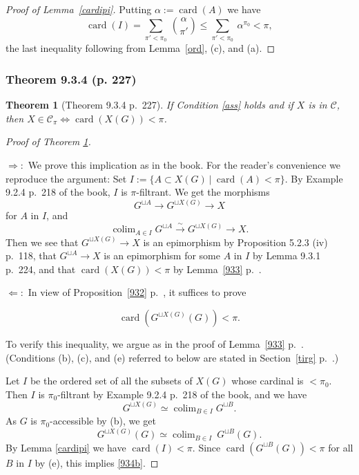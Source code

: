 \documentclass[12pt]{article}%
\newtheorem{thm}{Theorem}%
\theoremstyle{remark}
\theoremstyle{definition}
\newcommand{\nn}{\noindent}
\newcommand{\C}{\mathcal C}
\newcommand{\si}{\Leftarrow}
\newcommand{\ssi}{\Leftrightarrow}%
\newcommand{\then}{\Rightarrow}
\newcommand{\xr}{\xrightarrow}
\DeclareMathOperator*{\colim}{colim}
\DeclareMathOperator{\card}{card}%
\begin{document}
\begin{proof}[Proof of Lemma~\ref{cardipi}] 
Putting $\alpha:=\card(A)$ we have
$$
\card(I)=\sum_{\pi'<\pi_0}\ \binom{\alpha}{\pi'}\le\sum_{\pi'<\pi_0}\ \alpha^{\pi_0}<\pi,
$$ 
the last inequality following from Lemma~\ref{ord}, (c), and (a). 
\end{proof}

\subsubsection{Theorem 9.3.4 (p. 227)}

\begin{thm}[Theorem 9.3.4 p.~227]\label{934}
If Condition \ref{ass} holds and if $X$ is in $\C$, then $X\in\C_\pi\ssi\card(X(G))<\pi$.
\end{thm}

\begin{proof}[Proof of Theorem \ref{934}]${}$

\nn$\then:$ We prove this implication as in the book. For the reader's convenience we reproduce the argument: Set $I:=\{A\subset X(G)\ |\ \card(A)<\pi\}$. By Example 9.2.4 p.~218 of the book, $I$ is $\pi$-filtrant. We get the morphisms 
$$
G^{\sqcup A}\to G^{\sqcup X(G)}\to X
$$ 
for $A$ in $I$, and 
$$
\colim_{A\in I}G^{\sqcup A}\xr\sim G^{\sqcup X(G)}\to X.
$$ 
Then we see that $G^{\sqcup X(G)}\to X$ is an epimorphism by Proposition 5.2.3 (iv) p.~118, that $G^{\sqcup A}\to X$ is an epimorphism for some $A$ in $I$ by Lemma 9.3.1 p.~224, and that $\card(X(G))<\pi$ by Lemma~\ref{933} p.~\pageref{933}.

\nn$\si:$ In view of Proposition~\ref{932} p.~\pageref{932}, it suffices to prove  

\begin{equation}\label{934b}
\card(G^{\sqcup X(G)}(G))<\pi.
\end{equation} 

To verify this inequality, we argue as in the proof of Lemma~\ref{933} p.~\pageref{933}. (Conditions (b), (c), and (e) referred to below are stated in Section~\ref{tirg} p.~\pageref{tirg}.)

Let $I$ be the ordered set of all the subsets of $X(G)$ whose cardinal is $<\pi_0$. Then $I$ is $\pi_0$-filtrant by Example 9.2.4 p.~218 of the book, and we have 
$$
G^{\sqcup X(G)}\simeq\colim_{B\in I}G^{\sqcup B}.
$$ 
As $G$ is $\pi_0$-accessible by (b), we get 
$$
G^{\sqcup X(G)}(G)\simeq\colim_{B\in I}\ G^{\sqcup B}(G).
$$ 
By Lemma \ref{cardipi} we have $\card(I)<\pi$. Since $\card(G^{\sqcup B}(G))<\pi$ for all $B$ in $I$ by (e), this implies \eqref{934b}.
\end{proof}
\end{document}

